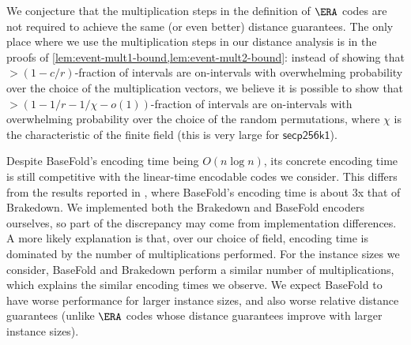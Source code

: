 \begin{remark}
\label{rem:conjectured-era}
We conjecture that the multiplication steps in the definition of $\ERA$ codes are not required to achieve the same (or even better) distance guarantees.
The only place where we use the multiplication steps in our distance analysis is in the proofs of \cref{lem:event-mult1-bound,lem:event-mult2-bound}: instead of showing that $> (1-c/r)$-fraction of intervals are on-intervals with overwhelming probability over the choice of the multiplication vectors, we believe it is possible to show that $> (1 - 1/r - 1/\chi - o(1))$-fraction of intervals are on-intervals with overwhelming probability over the choice of the random permutations, where $\chi$ is the characteristic of the finite field (this is very large for $\mathsf{secp256k1}$).
\end{remark}

\begin{remark}
\label{rem:basefold-performance}
Despite BaseFold's encoding time being $O(n \log n)$, its concrete encoding time is still competitive with the linear-time encodable codes we consider.
This differs from the results reported in \cite{ZeilbergerCF24}, where BaseFold's encoding time is about 3x that of Brakedown.
We implemented both the Brakedown and BaseFold encoders ourselves, so part of the discrepancy may come from implementation differences.
A more likely explanation is that, over our choice of field, encoding time is dominated by the number of multiplications performed. For the instance sizes we consider, BaseFold and Brakedown perform a similar number of multiplications, which explains the similar encoding times we observe.
We expect BaseFold to have worse performance for larger instance sizes, and also worse relative distance guarantees (unlike $\ERA$ codes whose distance guarantees improve with larger instance sizes).
\end{remark}




